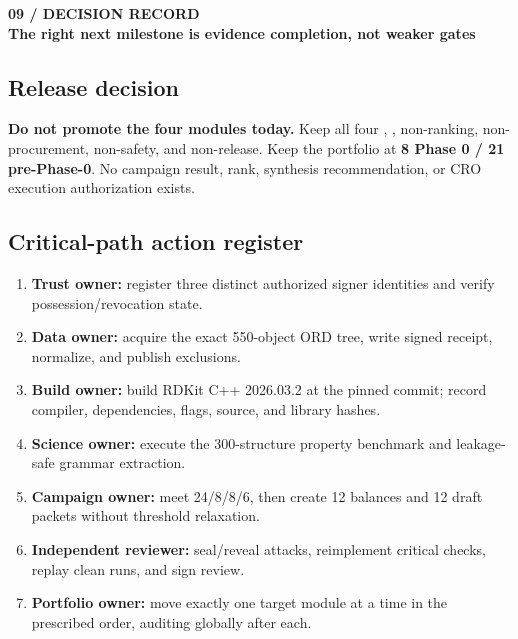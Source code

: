 \documentclass[10pt,a4paper]{article}
\newcommand{\PageTitle}[2]{%
  {\sffamily\fontsize{7.5}{9}\selectfont\bfseries\color{Cyan}\MakeUppercase{#1}}\\[-1pt]
  {\sffamily\fontsize{20}{22}\selectfont\bfseries\color{Navy}#2}\par\vspace{3mm}}
\newcommand{\code}[1]{{\ttfamily\fontsize{7.2}{8.4}\selectfont\detokenize{#1}}}
\begin{document}
\PageTitle{09 / Decision record}{The right next milestone is evidence completion, not weaker gates}
\begin{minipage}[t]{.47\linewidth}
\subsection*{Release decision}
\begin{tcolorbox}[colback=PaleRed,colframe=Red!40,boxrule=.6pt,arc=2mm,left=3mm,right=3mm,top=3mm,bottom=3mm]
\textbf{Do not promote the four modules today.} Keep all four \code{LOCKED_INTERNAL}, \code{AUDIT_ONLY}, non-ranking, non-procurement, non-safety, and non-release. Keep the portfolio at \textbf{8 Phase 0 / 21 pre-Phase-0}. No campaign result, rank, synthesis recommendation, or CRO execution authorization exists.
\end{tcolorbox}

\subsection*{Critical-path action register}
\begin{enumerate}
  \item \textbf{Trust owner:} register three distinct authorized signer identities and verify possession/revocation state.
  \item \textbf{Data owner:} acquire the exact 550-object ORD tree, write signed receipt, normalize, and publish exclusions.
  \item \textbf{Build owner:} build RDKit C++ 2026.03.2 at the pinned commit; record compiler, dependencies, flags, source, and library hashes.
  \item \textbf{Science owner:} execute the 300-structure property benchmark and leakage-safe grammar extraction.
  \item \textbf{Campaign owner:} meet 24/8/8/6, then create 12 balances and 12 draft packets without threshold relaxation.
  \item \textbf{Independent reviewer:} seal/reveal attacks, reimplement critical checks, replay clean runs, and sign review.
  \item \textbf{Portfolio owner:} move exactly one target module at a time in the prescribed order, auditing globally after each.
\end{enumerate}
\end{minipage}\hfill
\end{document}
